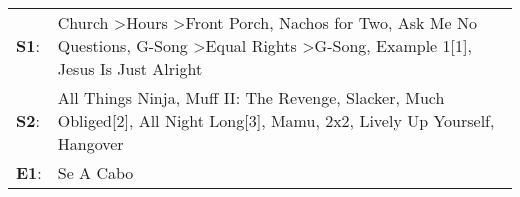\begin{supertabular}{p{0.03\textwidth}p{0.92\textwidth}}
 \textbf{S1}:  &  Church\textsuperscript{} \textgreater \enspace Hours\textsuperscript{} \textgreater \enspace Front Porch\textsuperscript{}, \enspace Nachos for Two\textsuperscript{}, \enspace Ask Me No Questions\textsuperscript{}, \enspace G-Song\textsuperscript{} \textgreater \enspace Equal Rights\textsuperscript{} \textgreater \enspace G-Song\textsuperscript{}, \enspace Example 1[1]\textsuperscript{}, \enspace Jesus Is Just Alright\textsuperscript{}  \enspace  \\
 \textbf{S2}:  &                                                                                   All Things Ninja\textsuperscript{}, \enspace Muff II: The Revenge\textsuperscript{}, \enspace Slacker\textsuperscript{}, \enspace Much Obliged[2]\textsuperscript{}, \enspace All Night Long[3]\textsuperscript{}, \enspace Mamu\textsuperscript{}, \enspace 2x2\textsuperscript{}, \enspace Lively Up Yourself\textsuperscript{}, \enspace Hangover\textsuperscript{}  \enspace  \\
 \textbf{E1}:  &                                                                                                                                                                                                                                                                                                                                                                                                                              Se A Cabo\textsuperscript{}  \enspace  \\
\end{supertabular}
